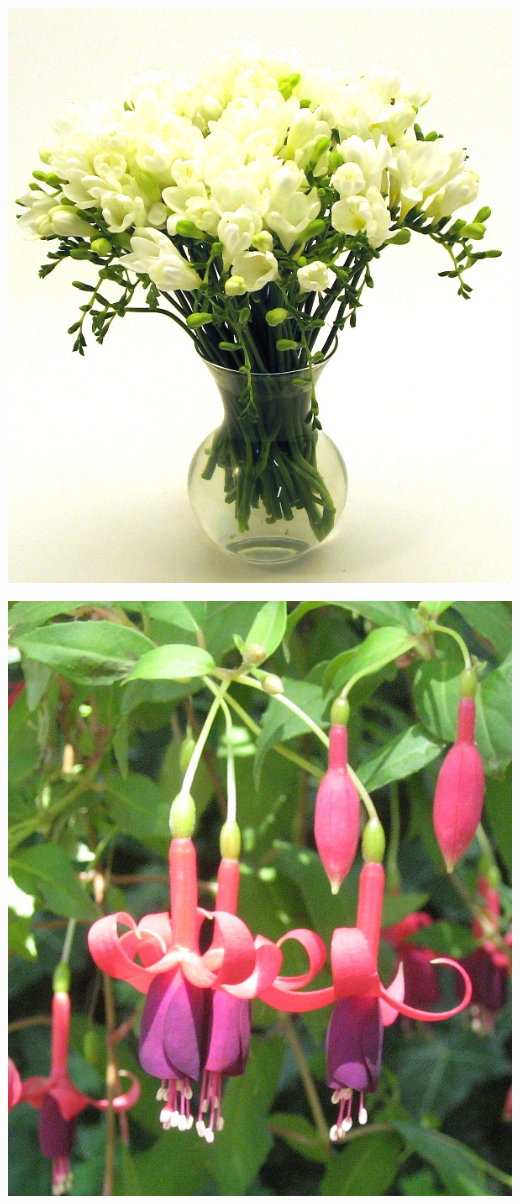 \documentclass{article}
\begin{document}
\begin{center}
\includegraphics[height=0.9\textheight, angle=90]{../Freesia_white.jpg}
\end{center}
\newpage

\begin{center}
\includegraphics[height=0.9\textheight, angle=90]{../Fuchsia.jpg}
\end{center}
\newpage
\end{document}
